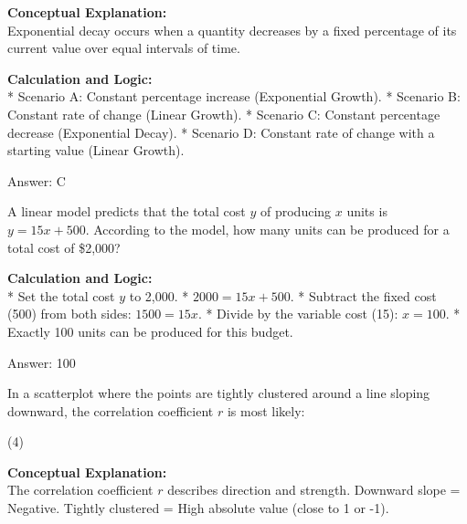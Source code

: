 \documentclass[11pt,paper=a4,answers]{exam}
\begin{document}
\begin{questions}
\begin{solution}
\textbf{Conceptual Explanation:} \\
Exponential decay occurs when a quantity decreases by a fixed percentage of its current value over equal intervals of time.

\vspace{30pt}

\textbf{Calculation and Logic:} \\
* Scenario A: Constant percentage increase (Exponential Growth).
* Scenario B: Constant rate of change (Linear Growth).
* Scenario C: Constant percentage decrease (Exponential Decay).
* Scenario D: Constant rate of change with a starting value (Linear Growth).

\vspace{30pt}

Answer: \colorbox{yellow!100}{C}
\end{solution}

\vspace{60pt}

\question
A linear model predicts that the total cost $y$ of producing $x$ units is $y = 15x + 500$. According to the model, how many units can be produced for a total cost of \$2,000?

\begin{solution}
\textbf{Calculation and Logic:} \\
* Set the total cost $y$ to 2,000.
* $2000 = 15x + 500$.
* Subtract the fixed cost (500) from both sides: $1500 = 15x$.
* Divide by the variable cost (15): $x = 100$.
* Exactly 100 units can be produced for this budget.

\vspace{30pt}

Answer: \colorbox{yellow!100}{100}
\end{solution}

\vspace{60pt}

\question
In a scatterplot where the points are tightly clustered around a line sloping downward, the correlation coefficient $r$ is most likely:
\begin{tasks}(4)
\end{tasks}

\begin{solution}
\textbf{Conceptual Explanation:} \\
The correlation coefficient $r$ describes direction and strength. Downward slope = Negative. Tightly clustered = High absolute value (close to 1 or -1).


\end{solution}
\end{questions}
\end{document}
